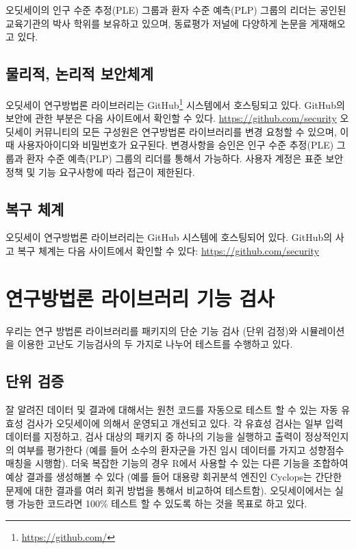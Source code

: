 \documentclass[10.5pt]{book}
\let\rmarkdownfootnote\footnote%
\def\footnote{\protect\rmarkdownfootnote}
\theoremstyle{definition}
\theoremstyle{definition}
\theoremstyle{definition}
\theoremstyle{remark}
\begin{document}
오딧세이의 인구 수준 추정(PLE) 그룹과 환자 수준 예측(PLP) 그룹의 리더는
공인된 교육기관의 박사 학위를 보유하고 있으며, 동료평가 저널에 다양하게
논문을 게재해오고 있다.

\subsection{물리적, 논리적 보안체계}\label{--}

오딧세이 연구방법론 라이브러리는 GitHub\footnote{\url{https://github.com/}}
시스템에서 호스팅되고 있다. GitHub의 보안에 관한 부분은 다음 사이트에서
확인할 수 있다. \url{https://github.com/security} 오딧세이 커뮤니티의
모든 구성원은 연구방법론 라이브러리를 변경 요청할 수 있으며, 이 때
사용자아이디와 비밀번호가 요구된다. 변경사항을 승인은 인구 수준
추정(PLE) 그룹과 환자 수준 예측(PLP) 그룹의 리더를 통해서 가능하다.
사용자 계정은 표준 보안정책 및 기능 요구사항에 따라 접근이 제한된다.

\subsection{복구 체계}\label{-}

오딧세이 연구방법론 라이브러리는 GitHub 시스템에 호스팅되어 있다.
GitHub의 사고 복구 체계는 다음 사이트에서 확인할 수 있다:
\url{https://github.com/security}

\section{연구방법론 라이브러리 기능 검사}\label{---}

우리는 연구 방법론 라이브러리를 패키지의 단순 기능 검사 (단위 검정)와
시뮬레이션을 이용한 고난도 기능검사의 두 가지로 나누어 테스트를 수행하고
있다.

\subsection{단위 검증}\label{-}

잘 알려진 데이터 및 결과에 대해서는 원천 코드를 자동으로 테스트 할 수
있는 자동 유효성 검사가 오딧세이에 의해서 운영되고 개선되고 있다. 각
유효성 검사는 일부 입력데이터를 지정하고, 검사 대상의 패키지 중 하나의
기능을 실행하고 출력이 정상적인지의 여부를 평가한다 (예를 들어 소수의
환자군을 가진 임시 데이터를 가지고 성향점수 매칭을 시행함). 더욱 복잡한
기능의 경우 R에서 사용할 수 있는 다른 기능을 조합하여 예상 결과를
생성해볼 수 있다 (예를 들어 대용량 회귀분석 엔진인 Cyclops는 간단한
문제에 대한 결과를 여러 회귀 방법을 통해서 비교하여 테스트함).
오딧세이에서는 실행 가능한 코드라면 100\% 테스트 할 수 있도록 하는 것을
목표로 하고 있다.
\end{document}
